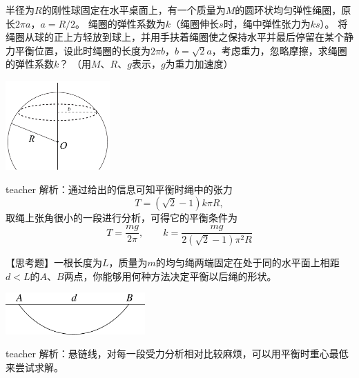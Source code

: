 \begin{example}

半径为$R$的刚性球固定在水平桌面上，有一个质量为$M$的圆环状均匀弹性绳圈，原长$2\pi a$，$a=R/2$。
绳圈的弹性系数为$k$（绳圈伸长$s$时，绳中弹性张力为$ks$）。
将绳圈从球的正上方轻放到球上，并用手扶着绳圈使之保持水平并最后停留在某个静力平衡位置，设此时绳圈的长度为$2\pi b，b = \sqrt{2}a$，考虑重力，忽略摩擦，求绳圈的弹性系数$k$？
（用$M$、$R$、$g$表示，$g$为重力加速度）
\begin{flushright}
\includegraphics[width = 0.3\textwidth]{images/static-force-19.pdf} 
\end{flushright}
\begin{taggedblock}{teacher}
\noindent
解析：通过给出的信息可知平衡时绳中的张力
\[
T = (\sqrt{2}-1)k\pi R,
\]
取绳上张角很小的一段进行分析，可得它的平衡条件为
\[
T = \frac{mg}{2\pi},\qquad k = \frac{mg}{2(\sqrt{2}-1)\pi^2R}
\]
\end{taggedblock}
\end{example}




\begin{example}
【思考题】一根长度为$L$，质量为$m$的均匀绳两端固定在处于同的水平面上相距$d<L$的$A$、$B$两点，你能够用何种方法决定平衡以后绳的形状。
\begin{flushright}
\includegraphics[width=0.4\textwidth]{images/static-force-30.pdf}
\end{flushright}
\begin{taggedblock}{teacher}
\noindent
解析：悬链线，对每一段受力分析相对比较麻烦，可以用平衡时重心最低来尝试求解。
\end{taggedblock}
\end{example}

